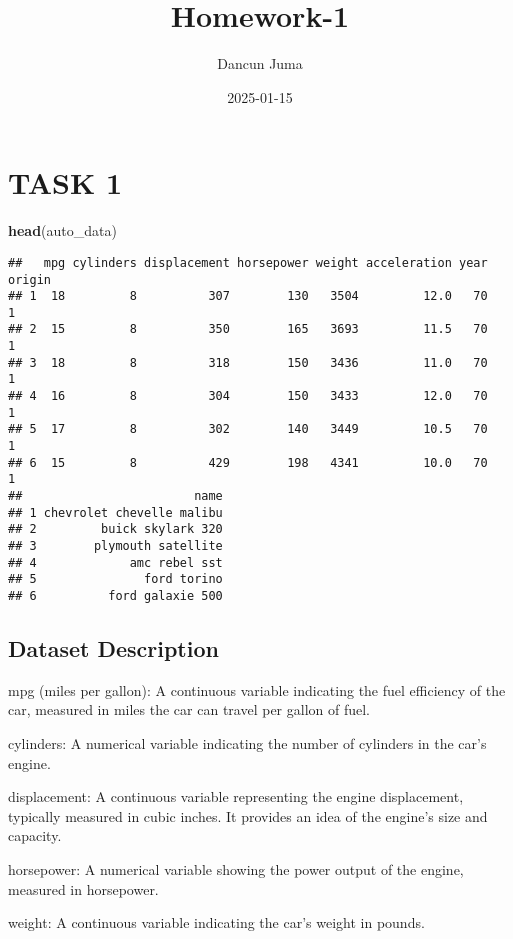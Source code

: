 \documentclass[
]{article}
\title{Homework-1}
\author{Dancun Juma}
\date{2025-01-15}
\newenvironment{Shaded}{\begin{snugshade}}{\end{snugshade}}
\newcommand{\FunctionTok}[1]{\textcolor[rgb]{0.13,0.29,0.53}{\textbf{#1}}}
\newcommand{\NormalTok}[1]{#1}
\begin{document}
\maketitle

\section{TASK 1}\label{task-1}

\begin{Shaded}
\begin{Highlighting}[]
\FunctionTok{head}\NormalTok{(auto\_data)}
\end{Highlighting}
\end{Shaded}

\begin{verbatim}
##   mpg cylinders displacement horsepower weight acceleration year origin
## 1  18         8          307        130   3504         12.0   70      1
## 2  15         8          350        165   3693         11.5   70      1
## 3  18         8          318        150   3436         11.0   70      1
## 4  16         8          304        150   3433         12.0   70      1
## 5  17         8          302        140   3449         10.5   70      1
## 6  15         8          429        198   4341         10.0   70      1
##                        name
## 1 chevrolet chevelle malibu
## 2         buick skylark 320
## 3        plymouth satellite
## 4             amc rebel sst
## 5               ford torino
## 6          ford galaxie 500
\end{verbatim}

\subsection{Dataset Description}\label{dataset-description}

mpg (miles per gallon): A continuous variable indicating the fuel
efficiency of the car, measured in miles the car can travel per gallon
of fuel.

cylinders: A numerical variable indicating the number of cylinders in
the car's engine.

displacement: A continuous variable representing the engine
displacement, typically measured in cubic inches. It provides an idea of
the engine's size and capacity.

horsepower: A numerical variable showing the power output of the engine,
measured in horsepower.

weight: A continuous variable indicating the car's weight in pounds.
\end{document}
